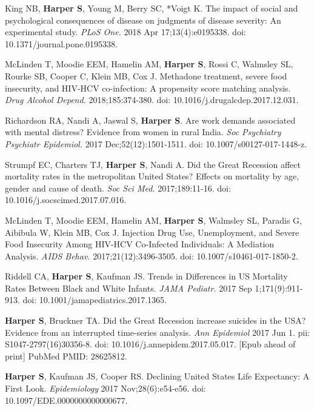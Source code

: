 \documentclass[
  letterpaper,
  DIV=11,
  numbers=noendperiod]{scrartcl}
\begin{document}
\begin{etaremune}
\item King NB, \textbf{Harper S}, Young M, Berry SC, *Voigt K. The impact of social and psychological consequences of disease on judgments of disease severity: An
experimental study. \emph{PLoS One.} 2018 Apr 17;13(4):e0195338. doi: 10.1371/journal.pone.0195338.

\item McLinden T, Moodie EEM, Hamelin AM, \textbf{Harper S}, Rossi C, Walmsley SL, Rourke SB, Cooper C, Klein MB, Cox J. Methadone treatment, severe food insecurity, and
HIV-HCV co-infection: A propensity score matching analysis. \emph{Drug Alcohol Depend.} 2018;185:374-380. doi: 10.1016/j.drugalcdep.2017.12.031.

\item *Richardson RA, Nandi A, Jaswal S, \textbf{Harper S}. Are work demands associated with mental distress? Evidence from women in rural India. \emph{Soc Psychiatry Psychiatr
Epidemiol.} 2017 Dec;52(12):1501-1511. doi: 10.1007/s00127-017-1448-z.

\item Strumpf EC, Charters TJ, \textbf{Harper S}, Nandi A. Did the Great Recession affect mortality rates in the metropolitan United States? Effects on mortality by age, gender and cause of death. \emph{Soc Sci Med.} 2017;189:11-16. doi: 10.1016/j.socscimed.2017.07.016.

\item McLinden T, Moodie EEM, Hamelin AM, \textbf{Harper S}, Walmsley SL, Paradis G, Aibibula W, Klein MB, Cox J. Injection Drug Use, Unemployment, and Severe Food Insecurity Among HIV-HCV Co-Infected Individuals: A Mediation Analysis. \emph{AIDS Behav.} 2017;21(12):3496-3505. doi: 10.1007/s10461-017-1850-2.

\item *Riddell CA, \textbf{Harper S}, Kaufman JS. Trends in Differences in US Mortality Rates Between Black and White Infants. \emph{JAMA Pediatr.} 2017 Sep 1;171(9):911-913. doi: 10.1001/jamapediatrics.2017.1365.

\item \textbf{Harper S}, Bruckner TA. Did the Great Recession increase suicides in the USA? Evidence from an interrupted time-series analysis. \emph{Ann Epidemiol} 2017 Jun 1. pii: S1047-2797(16)30356-8. doi: 10.1016/j.annepidem.2017.05.017. [Epub ahead of print] PubMed PMID: 28625812.

\item \textbf{Harper S}, Kaufman JS, Cooper RS. Declining United States Life Expectancy: A First Look. \emph{Epidemiology} 2017 Nov;28(6):e54-e56. doi: 10.1097/EDE.0000000000000677.


\end{etaremune}
\end{document}
